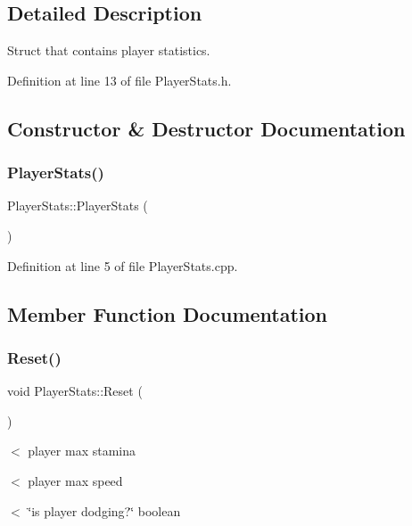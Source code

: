 \subsection{Detailed Description}
Struct that contains player statistics. 

Definition at line 13 of file Player\+Stats.\+h.



\subsection{Constructor \& Destructor Documentation}
\mbox{\label{struct_player_stats_a80dcf207b4271ad8e3e8e3766b52a4eb}} 
\subsubsection{\texorpdfstring{Player\+Stats()}{PlayerStats()}}
{\footnotesize\ttfamily Player\+Stats\+::\+Player\+Stats (\begin{DoxyParamCaption}{ }\end{DoxyParamCaption})}



Definition at line 5 of file Player\+Stats.\+cpp.



\subsection{Member Function Documentation}
\mbox{\label{struct_player_stats_a142ec7949841369d22ea4d6e7fa78caf}} 
\subsubsection{\texorpdfstring{Reset()}{Reset()}}
{\footnotesize\ttfamily void Player\+Stats\+::\+Reset (\begin{DoxyParamCaption}{ }\end{DoxyParamCaption})}

$<$ player max stamina

$<$ player max speed

$<$ \char`\"{}is player dodging?\char`\"{} boolean

